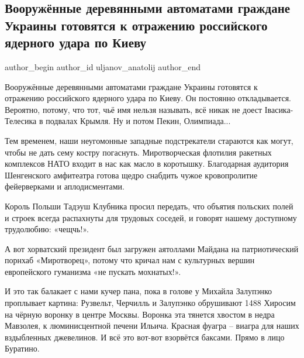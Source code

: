  
 
 
 
 
 
\subsection{Вооружённые деревянными автоматами граждане Украины готовятся к отражению российского ядерного удара по Киеву}
\label{sec:03_02_2022.fb.uljanov_anatolij.1.vtorzhenie}
 
\ifcmt
 author_begin
   author_id uljanov_anatolij
 author_end
\fi

Вооружённые деревянными автоматами граждане Украины готовятся к отражению
российского ядерного удара по Киеву. Он постоянно откладывается. Вероятно,
потому, что тот, чьё имя нельзя называть, всё никак не доест Івасика-Телесика в
подвалах Крымля. Ну и потом Пекин, Олимпиада...


Тем временем, наши неугомонные западные подстрекатели стараются как могут,
чтобы не дать сему костру погаснуть. Миротворческая флотилия ракетных
комплексов НАТО входит в нас как масло в коротышку. Благодарная аудитория
Шенгенского амфитеатра готова щедро снабдить чужое кровопролитие фейерверками и
аплодисментами. 

Король Польши Тадэуш Клубника просил передать, что объятия польских полей и
строек всегда распахнуты для трудовых соседей, и говорят нашему доступному
трудолюбию: «чещчь!».  

А вот хорватский президент был загружен аятоллами Майдана на патриотический
порнхаб «Миротворец», потому что кричал нам с культурных вершин европейского
гуманизма «не пускать мохнатых!». 

И это так балакает с нами кучер пана, пока в голове у Михайла Залупэнко
проплывает картина: Рузвельт, Черчилль и Залупэнко обрушивают 1488 Хиросим на
чёрную воронку в центре Москвы. Воронка эта тянется хвостом в недра Мавзолея, к
люминисцентной печени Ильича. Красная фуагра – виагра для наших вздыбленных
джевелинов. И всё это вот-вот взорвётся баксами. Прямо в лицо Буратино.
